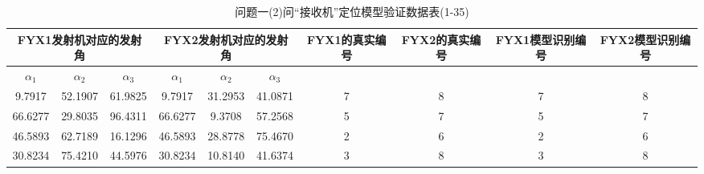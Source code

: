 \documentclass[withoutpreface,bwprint]{cumcmthesis} %
\begin{document}
\begin{appendices}
					
						\begin{table}[htbp!]
						\footnotesize
						\caption{问题一(2)问“接收机”定位模型验证数据表(1-35)}
						\centering
						\tabcolsep=0.1cm
						\begin{tabular}{@{}cccccccccc@{}}
							\toprule
							\multicolumn{3}{c}{\textbf{FYX1发射机对应的发射角}}                                                           & \multicolumn{3}{c}{\textbf{FYX2发射机对应的发射角}}                                                           & \textbf{FYX1的真实编号} & \textbf{FYX2的真实编号} & \textbf{FYX1模型识别编号} & \textbf{FYX2模型识别编号} \\ \midrule
							\multicolumn{1}{c|}{\textbf{$\alpha_{1}$}} & \multicolumn{1}{c|}{\textbf{$\alpha_{2}$}} & \multicolumn{1}{c|}{\textbf{$\alpha_{3}$}} & \multicolumn{1}{c|}{\textbf{$\alpha_{1}$}} & \multicolumn{1}{c|}{\textbf{$\alpha_{2}$}} & \multicolumn{1}{c|}{\textbf{$\alpha_{3}$}} & \multicolumn{4}{c}{\textbf{}}  
		                                            \\ \midrule
							9.7917                           & 52.1907                          & 61.9825                          & 9.7917                           & 31.2953                          & 41.0871                          & 7                    & 8                    & 7                      & 8                      \\
							66.6277                          & 29.8035                          & 96.4311                          & 66.6277                          & 9.3708                           & 57.2568                          & 5                    & 7                    & 5                      & 7                      \\
							46.5893                          & 62.7189                          & 16.1296                          & 46.5893                          & 28.8778                          & 75.4670                          & 2                    & 6                    & 2                      & 6                      \\
							30.8234                          & 75.4210                          & 44.5976                          & 30.8234                          & 10.8140                          & 41.6374                          & 3                    & 8                    & 3                      & 8                      \\

\end{tabular}
\end{table}
\end{appendices}
\end{document}
